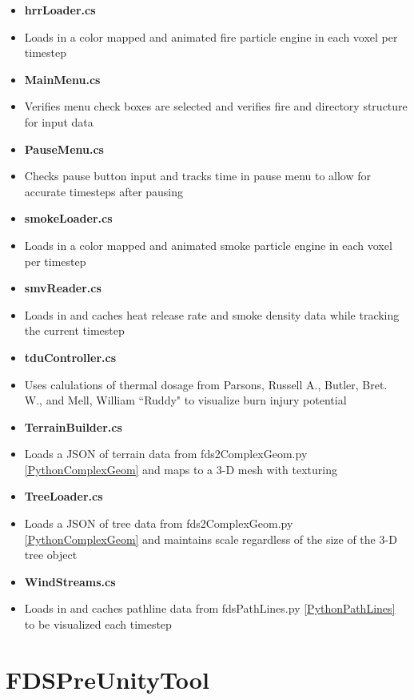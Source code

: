 \begin{itemize}
\begin{itemize}
        \item \textbf{hrrLoader.cs}
        \item[] Loads in a color mapped and animated fire particle engine in each voxel per timestep
        \item \textbf{MainMenu.cs}
        \item[] Verifies menu check boxes are selected and verifies fire and directory structure for input data
        \item \textbf{PauseMenu.cs}
        \item[] Checks pause button input and tracks time in pause menu to allow for accurate timesteps after pausing 
        \item \textbf{smokeLoader.cs}
        \item[] Loads in a color mapped and animated smoke particle engine in each voxel per timestep
        \item \textbf{smvReader.cs}
        \item[] Loads in and caches heat release rate and smoke density data while tracking the current timestep
        
        \item \textbf{tduController.cs}
        \item[] Uses calulations of thermal dosage from Parsons, Russell A., Butler, Bret. W., and Mell, William “Ruddy" to visualize burn injury potential \cite{Parsons2014}
        \item \textbf{TerrainBuilder.cs}
        \item[] Loads a JSON of terrain data from fds2ComplexGeom.py \ref{PythonComplexGeom} and maps to a 3-D mesh with texturing
        \item \textbf{TreeLoader.cs}
\item[] Loads a JSON of tree data from  fds2ComplexGeom.py \ref{PythonComplexGeom} and maintains scale regardless of the size of the 3-D tree object        
        \item \textbf{WindStreams.cs}
        \item[] Loads in and caches pathline data from fdsPathLines.py \ref{PythonPathLines} to be visualized each timestep
        \end{itemize}
\end{itemize}
\pagebreak

\section{FDSPreUnityTool}
